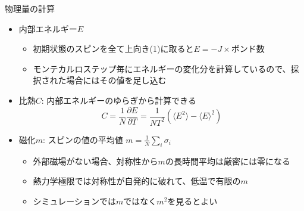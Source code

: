 
\begin{frame}[t,fragile]{物理量の計算}
  \begin{itemize}
  \item 内部エネルギー$E$
    \begin{itemize}
    \item 初期状態のスピンを全て上向き(1)に取ると$E=-J \times \text{ボンド数}$
    \item モンテカルロステップ毎にエネルギーの変化分を計算しているので、採択された場合にはその値を足し込む
    \end{itemize}
  \item 比熱$C$: 内部エネルギーのゆらぎから計算できる
    \[
    C = \frac{1}{N} \frac{\partial E}{\partial T} = \frac{1}{NT^2} (\langle E^2 \rangle - \langle E \rangle^2)
    \]
  \item 磁化$m$: スピンの値の平均値 $m = \frac{1}{N} \sum_i \sigma_i$
    \begin{itemize}
    \item 外部磁場がない場合、対称性から$m$の長時間平均は厳密には零になる
    \item 熱力学極限では対称性が自発的に破れて、低温で有限の$m$
    \item シミュレーションでは$m$ではなく$m^2$を見るとよい
    \end{itemize}
  \end{itemize}
\end{frame}
